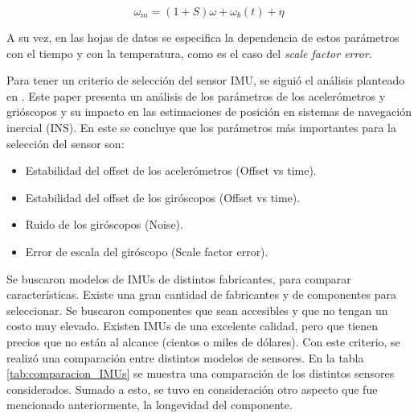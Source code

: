 \begin{equation}
    \omega_m = (1+S)\omega + \omega_b (t) + \eta
    \label{eq:medicion_vs_real}
\end{equation}

A su vez, en las hojas de datos se especifica la dependencia de estos parámetros con el tiempo y con la temperatura, como es el caso del \textit{scale factor error}.

Para tener un criterio de selección del sensor IMU, se siguió el análisis planteado en \cite{borodacz2022review}. Este paper presenta un análisis de los parámetros de los acelerómetros y grióscopos y su impacto en las estimaciones de posición en sistemas de navegación inercial (INS). En este se concluye que los parámetros más importantes para la selección del sensor son:

\begin{itemize}
    \item Estabilidad del offset de los acelerómetros (Offset vs time).
    \item Estabilidad del offset de los giróscopos (Offset vs time).
    \item Ruido de los giróscopos (Noise).
    \item Error de escala del giróscopo (Scale factor error).
\end{itemize}

Se buscaron modelos de IMUs de distintos fabricantes, para comparar características. Existe una gran cantidad de fabricantes y de componentes para seleccionar. Se buscaron componentes que sean accesibles y que no tengan un costo muy elevado. Existen IMUs de una excelente calidad, pero que tienen precios que no están al alcance (cientos o miles de dólares). Con este criterio, se realizó una comparación entre distintos modelos de sensores. En la tabla \ref{tab:comparacion_IMUs} se muestra una comparación de los distintos sensores considerados. Sumado a esto, se tuvo en consideración otro aspecto que fue mencionado anteriormente, la longevidad del componente.

